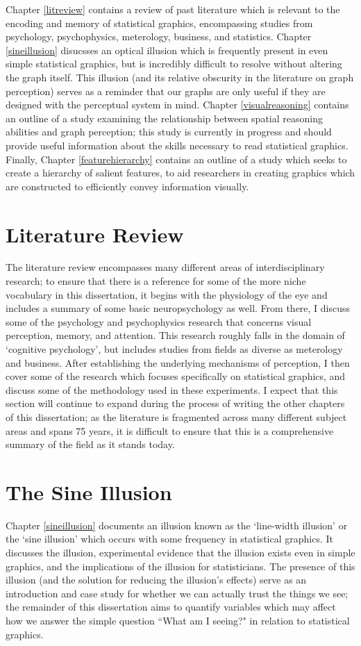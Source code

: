 \documentclass[11pt]{isuthesis}\usepackage[]{graphicx}\usepackage[]{color}
\begin{document}
Chapter \ref{litreview} contains a review of past literature which is relevant to the encoding and memory of statistical graphics, encompassing studies from psychology, psychophysics, meterology, business, and statistics. Chapter \ref{sineillusion} disucsses an optical illusion which is frequently present in even simple statistical graphics, but is incredibly difficult to resolve without altering the graph itself. This illusion (and its relative obscurity in the literature on graph perception) serves as a reminder that our graphs are only useful if they are designed with the perceptual system in mind. Chapter \ref{visualreasoning} contains an outline of a study examining the relationship between spatial reasoning abilities and graph perception; this study is currently in progress and should provide useful information about the skills necessary to read statistical graphics. Finally, Chapter \ref{featurehierarchy} contains an outline of a study which seeks to create a hierarchy of salient features, to aid researchers in creating graphics which are constructed to efficiently convey information visually. 

\section{Literature Review}
The literature review encompasses many different areas of interdisciplinary research; to ensure that there is a reference for some of the more niche vocabulary in this dissertation, it begins with the physiology of the eye and includes a summary of some basic neuropsychology as well. From there, I discuss some of the psychology and psychophysics research that concerns visual perception, memory, and attention. This research roughly falls in the domain of `cognitive psychology', but includes studies from fields as diverse as meterology and business. After establishing the underlying mechanisms of perception, I then cover some of the research which focuses specifically on statistical graphics, and discuss some of the methodology used in these experiments. I expect that this section will continue to expand during the process of writing the other chapters of this dissertation; as the literature is fragmented across many different subject areas and spans 75 years, it is difficult to ensure that this is a comprehensive summary of the field as it stands today. 

\section{The Sine Illusion}
Chapter \ref{sineillusion} documents an illusion known as the `line-width illusion' or the `sine illusion' which occurs with some frequency in statistical graphics. It discusses the illusion, experimental evidence that the illusion exists even in simple graphics, and the implications of the illusion for statisticians. The presence of this illusion (and the solution for reducing the illusion's effects) serve as an introduction and case study for whether we can actually trust the things we see; the remainder of this dissertation aims to quantify variables which may affect how we answer the simple question ``What am I seeing?" in relation to statistical graphics. 
\end{document}
